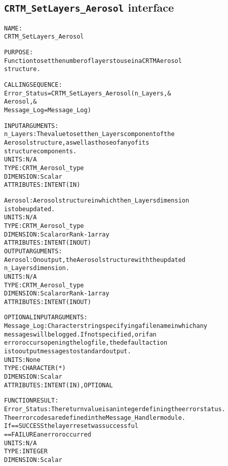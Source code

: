 \subsection{\texttt{CRTM\_SetLayers\_Aerosol} interface}
  \label{sec:CRTM_SetLayers_Aerosol_interface}
  \begin{alltt}
 
  NAME:
        CRTM_SetLayers_Aerosol
  
  PURPOSE:
        Function to set the number of layers to use in a CRTM Aerosol
        structure.
 
  CALLING SEQUENCE:
        Error_Status = CRTM_SetLayers_Aerosol( n_Layers               , &
                                               Aerosol                , &
                                               Message_Log=Message_Log  )
 
  INPUT ARGUMENTS:
        n_Layers:     The value to set the n_Layers component of the 
                      Aerosol structure, as well as those of any of its
                      structure components.
                      UNITS:      N/A
                      TYPE:       CRTM_Aerosol_type
                      DIMENSION:  Scalar
                      ATTRIBUTES: INTENT(IN)
 
        Aerosol:      Aerosol structure in which the n_Layers dimension
                      is to be updated.
                      UNITS:      N/A
                      TYPE:       CRTM_Aerosol_type
                      DIMENSION:  Scalar or Rank-1 array
                      ATTRIBUTES: INTENT(IN OUT)
  OUTPUT ARGUMENTS:
        Aerosol:      On output, the Aerosol structure with the updated
                      n_Layers dimension.
                      UNITS:      N/A
                      TYPE:       CRTM_Aerosol_type
                      DIMENSION:  Scalar or Rank-1 array
                      ATTRIBUTES: INTENT(IN OUT)
 
  OPTIONAL INPUT ARGUMENTS:
        Message_Log:  Character string specifying a filename in which any
                      messages will be logged. If not specified, or if an
                      error occurs opening the log file, the default action
                      is to output messages to standard output.
                      UNITS:      None
                      TYPE:       CHARACTER(*)
                      DIMENSION:  Scalar
                      ATTRIBUTES: INTENT(IN), OPTIONAL
 
  FUNCTION RESULT:
        Error_Status: The return value is an integer defining the error status.
                      The error codes are defined in the Message_Handler module.
                      If == SUCCESS the layer reset was successful
                         == FAILURE an error occurred
                      UNITS:      N/A
                      TYPE:       INTEGER
                      DIMENSION:  Scalar
 

\end{alltt}
